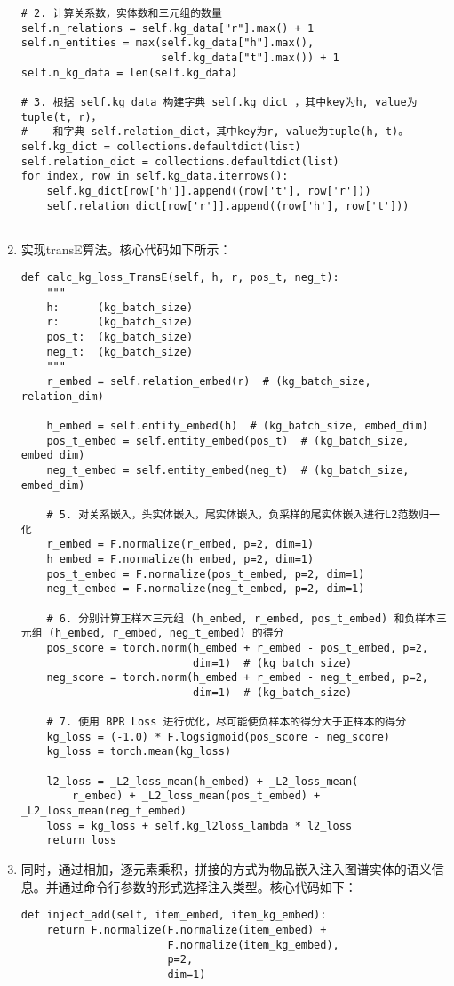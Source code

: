 \documentclass{ctexart}
\begin{document}
\begin{sloppypar}
\begin{enumerate}
\begin{lstlisting}[style=python]
# 2. 计算关系数，实体数和三元组的数量
self.n_relations = self.kg_data["r"].max() + 1
self.n_entities = max(self.kg_data["h"].max(),
                      self.kg_data["t"].max()) + 1
self.n_kg_data = len(self.kg_data)

# 3. 根据 self.kg_data 构建字典 self.kg_dict ，其中key为h, value为tuple(t, r)，
#    和字典 self.relation_dict，其中key为r, value为tuple(h, t)。
self.kg_dict = collections.defaultdict(list)
self.relation_dict = collections.defaultdict(list)
for index, row in self.kg_data.iterrows():
    self.kg_dict[row['h']].append((row['t'], row['r']))
    self.relation_dict[row['r']].append((row['h'], row['t']))
            
        \end{lstlisting}
        \item 实现transE算法。核心代码如下所示：
    \begin{lstlisting}[style=python]
def calc_kg_loss_TransE(self, h, r, pos_t, neg_t):
    """
    h:      (kg_batch_size)
    r:      (kg_batch_size)
    pos_t:  (kg_batch_size)
    neg_t:  (kg_batch_size)
    """
    r_embed = self.relation_embed(r)  # (kg_batch_size, relation_dim)

    h_embed = self.entity_embed(h)  # (kg_batch_size, embed_dim)
    pos_t_embed = self.entity_embed(pos_t)  # (kg_batch_size, embed_dim)
    neg_t_embed = self.entity_embed(neg_t)  # (kg_batch_size, embed_dim)

    # 5. 对关系嵌入，头实体嵌入，尾实体嵌入，负采样的尾实体嵌入进行L2范数归一化
    r_embed = F.normalize(r_embed, p=2, dim=1)
    h_embed = F.normalize(h_embed, p=2, dim=1)
    pos_t_embed = F.normalize(pos_t_embed, p=2, dim=1)
    neg_t_embed = F.normalize(neg_t_embed, p=2, dim=1)

    # 6. 分别计算正样本三元组 (h_embed, r_embed, pos_t_embed) 和负样本三元组 (h_embed, r_embed, neg_t_embed) 的得分
    pos_score = torch.norm(h_embed + r_embed - pos_t_embed, p=2,
                           dim=1)  # (kg_batch_size)
    neg_score = torch.norm(h_embed + r_embed - neg_t_embed, p=2,
                           dim=1)  # (kg_batch_size)

    # 7. 使用 BPR Loss 进行优化，尽可能使负样本的得分大于正样本的得分
    kg_loss = (-1.0) * F.logsigmoid(pos_score - neg_score)
    kg_loss = torch.mean(kg_loss)

    l2_loss = _L2_loss_mean(h_embed) + _L2_loss_mean(
        r_embed) + _L2_loss_mean(pos_t_embed) + _L2_loss_mean(neg_t_embed)
    loss = kg_loss + self.kg_l2loss_lambda * l2_loss
    return loss
    \end{lstlisting}
    \item 同时，通过相加，逐元素乘积，拼接的方式为物品嵌入注入图谱实体的语义信息。并通过命令行参数的形式选择注入类型。核心代码如下：
    \begin{lstlisting}[style=python]        
def inject_add(self, item_embed, item_kg_embed):
    return F.normalize(F.normalize(item_embed) +
                       F.normalize(item_kg_embed),
                       p=2,
                       dim=1)


\end{lstlisting}
\end{enumerate}
\end{sloppypar}
\end{document}

